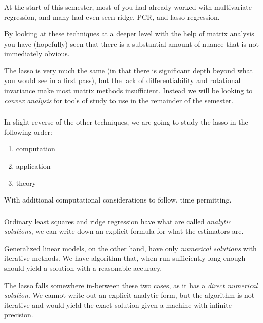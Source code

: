 \begin{frame}[fragile] \frametitle{}

At the start of this semester, most of you had already worked with
multivariate regression, and many had even seen ridge, PCR, and lasso
regression.

\pause By looking at these techniques at a deeper level with the
help of matrix analysis you have (hopefully) seen that there is a
substantial amount of nuance that is not immediately obvious.

\pause The lasso is very much the same (in that there is significant depth beyond what
you would see in a first pass), but the lack of differentiability and
rotational invariance make most matrix methods insufficient. Instead
we will be looking to \textit{convex analysis} for tools of study to
use in the remainder of the semester.

\end{frame}

\begin{frame}[fragile] \frametitle{}

In slight reverse of the other techniques, we are going to study
the lasso in the following order:
\begin{enumerate}
\item computation
\item application
\item theory
\end{enumerate}
With additional computational considerations to follow, time
permitting.

\end{frame}

\begin{frame}[fragile] \frametitle{}

Ordinary least squares and ridge regression have what are called
\textit{analytic solutions}, we can write down an explicit formula
for what the estimators are.

\pause Generalized linear models, on the other hand, have only
\textit{numerical solutions} with iterative methods. We have algorithm
that, when run sufficiently long enough should yield a solution with
a reasonable accuracy.

\pause The lasso falls somewhere in-between these two cases, as it
has a \textit{direct numerical solution}. We cannot write out an
explicit analytic form, but the algorithm is not iterative and would
yield the exact solution given a machine with infinite precision.

\end{frame}


